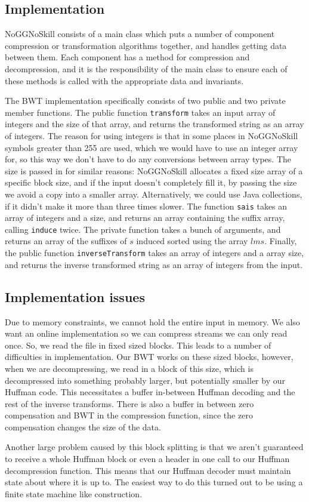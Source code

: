 \documentclass[a4paper]{article}
\begin{document}
\begin{multicols}{2}
\section {Implementation}
\vspace*{-.4cm}
NoGGNoSkill consists of a main class which puts a number of component compression or transformation algorithms together, and handles getting data between them. Each component has a method for compression and decompression, and it is the responsibility of the main class to ensure each of these methods is called with the appropriate data and invariants.

The BWT implementation specifically consists of two public and two private member functions. The public function \texttt{transform} takes an input array of integers and the size of that array, and returns the transformed string as an array of integers. The reason for using integers is that in some places in NoGGNoSkill symbols greater than 255 are used, which we would have to use an integer array for, so this way we don't have to do any conversions between array types. The size is passed in for similar reasons: NoGGNoSkill allocates a fixed size array of a specific block size, and if the input doesn't completely fill it, by passing the size we avoid a copy into a smaller array. Alternatively, we could use Java collections, if it didn't make it more than three times slower. The function \texttt{sais} takes an array of integers and a size, and returns an array containing the suffix array, calling \texttt{induce} twice. The private function  takes a bunch of arguments, and returns an array of the suffixes of $s$ induced sorted using the array $lms$. Finally, the public function \texttt{inverseTransform} takes an array of integers and a array size, and returns the inverse transformed string as an array of integers from the input.
\subsection{Implementation issues}
Due to memory constraints, we cannot hold the entire input in memory. We also want an online implementation so we can compress streams we can only read once. So, we read the file in fixed sized blocks. This leads to a number of difficulties in implementation. Our BWT works on these sized blocks, however, when we are decompressing, we read in a block of this size, which is decompressed into something probably larger, but potentially smaller by our Huffman code. This necessitates a buffer in-between Huffman decoding and the rest of the inverse transforms. There is also a buffer in between zero compensation and BWT in the compression function, since the zero compensation changes the size of the data.

Another large problem caused by this block splitting is that we aren't guaranteed to receive a whole Huffman block or even a header in one call to our Huffman decompression function. This means that our Huffman decoder must maintain state about where it is up to. The easiest way to do this turned out to be using a finite state machine like construction.
\end{multicols}
\vspace*{-1.0cm}
\end{document}
